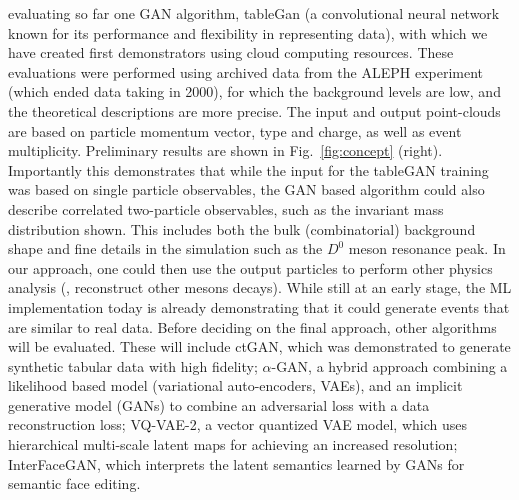 evaluating so far one GAN algorithm, tableGan (a convolutional neural network known for its performance and flexibility in representing data), with which we have created first demonstrators using cloud computing resources. These evaluations were performed using {\eecol} archived data from the ALEPH experiment (which ended data taking in 2000), for which the background levels are low, and the theoretical descriptions are more precise. The input and output point-clouds are based on particle momentum vector,  type and charge, as well as event multiplicity. Preliminary results are shown in Fig.~\ref{fig:concept} (right). Importantly this demonstrates that while the input for the tableGAN training was based on single particle observables, the GAN based algorithm could also describe correlated two-particle observables, such as the invariant mass distribution shown. This includes both the bulk (combinatorial) background shape and fine details in the simulation such as the $D^0$ meson resonance peak. In our approach, one could then use the output particles to perform other physics analysis (\eg, reconstruct other mesons decays). While still at an early stage, the ML implementation today is already demonstrating that it could generate {\eecol} events that are similar to real data. Before deciding on the final approach, other algorithms will be evaluated. These will include ctGAN, which was demonstrated to generate synthetic tabular data with high fidelity; $\alpha$-GAN, a hybrid approach combining a likelihood based model (variational auto-encoders, VAEs), and an implicit generative model (GANs) to combine an adversarial loss with a data reconstruction loss; VQ-VAE-2, a vector quantized VAE model, which uses hierarchical multi-scale latent maps for achieving an increased resolution; InterFaceGAN, which interprets the latent semantics learned by GANs for semantic face editing. 












